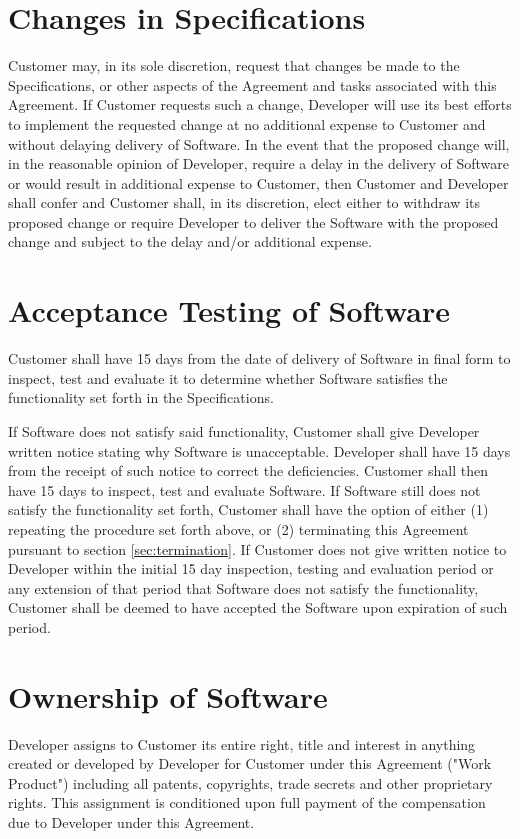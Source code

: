 \documentclass[11pt]{article}
\begin{document}
\section{Changes in Specifications}
Customer may, in its sole discretion, request that changes be made to the Specifications, or other aspects of the Agreement and tasks associated with this Agreement. If Customer requests such a change, Developer will use its best efforts to implement the requested change at no additional expense to Customer and without delaying delivery of Software. In the event that the proposed change will, in the reasonable opinion of Developer, require a delay in the delivery of Software or would result in additional expense to Customer, then Customer and Developer shall confer and Customer shall, in its discretion, elect either to withdraw its proposed change or require Developer to deliver the Software with the proposed change and subject to the delay and/or additional expense.
\section{Acceptance Testing of Software}
Customer shall have 15 days from the date of delivery of Software in final form to inspect, test and evaluate it to determine whether Software satisfies the functionality set forth in the Specifications.

If Software does not satisfy said functionality, Customer shall give Developer written notice stating why Software is unacceptable. Developer shall have 15 days from the receipt of such notice to correct the deficiencies. Customer shall then have 15 days to inspect, test and evaluate Software. If Software still does not satisfy the functionality set forth, Customer shall have the option of either (1) repeating the procedure set forth above, or (2) terminating this Agreement pursuant to section \ref{sec:termination}. If Customer does not give written notice to Developer within the initial 15 day inspection, testing and evaluation period or any extension of that period that Software does not satisfy the functionality, Customer shall be deemed to have accepted the Software upon expiration of such period.
\section{Ownership of Software}
Developer assigns to Customer its entire right, title and interest in anything created or developed by Developer for Customer under this Agreement ("Work Product") including all patents, copyrights, trade secrets and other proprietary rights. This assignment is conditioned upon full payment of the compensation due to Developer under this Agreement. 
\end{document}
